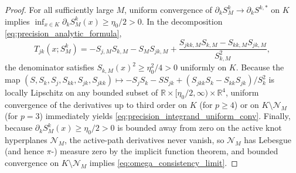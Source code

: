 \begin{proof}
For all sufficiently large $M$, uniform convergence of $\partial_k S^k_M \to \partial_k S^{k,*}$ on $K$ implies $\inf_{x \in K} \partial_k S^k_M(x) \ge \eta_0 / 2 > 0$. In the decomposition \eqref{eq:precision_analytic_formula},
\begin{equation}
    T_{jk}(x; S^k_M) = -S_{j, M} S_{k, M} - S_M S_{jk, M} + \frac{S_{jkk, M} S_{k, M} - S_{kk, M} S_{jk, M}}{S_{k, M}^2},
\end{equation}
the denominator satisfies $S_{k, M}(x)^2 \ge \eta_0^2 / 4 > 0$ uniformly on $K$. Because the map $(S, S_k, S_j, S_{kk}, S_{jk}, S_{jkk}) \mapsto -S_j S_k - S S_{jk} + (S_{jkk} S_k - S_{kk} S_{jk})/S_k^2$ is locally Lipschitz on any bounded subset of $\mathbb{R} \times [\eta_0/2, \infty) \times \mathbb{R}^4$, uniform convergence of the derivatives up to third order on $K$ (for $p \ge 4$) or on $K \setminus \mathcal{N}_M$ (for $p = 3$) immediately yields \eqref{eq:precision_integrand_uniform_conv}. Finally, because $\partial_k S^k_M(x) \ge \eta_0 / 2 > 0$ is bounded away from zero on the active knot hyperplanes $\mathcal{N}_M$, the active-path derivatives never vanish, so $\mathcal{N}_M$ has Lebesgue (and hence $\pi$-) measure zero by the implicit function theorem, and bounded convergence on $K \setminus \mathcal{N}_M$ implies \eqref{eq:omega_consistency_limit}.
\end{proof}
